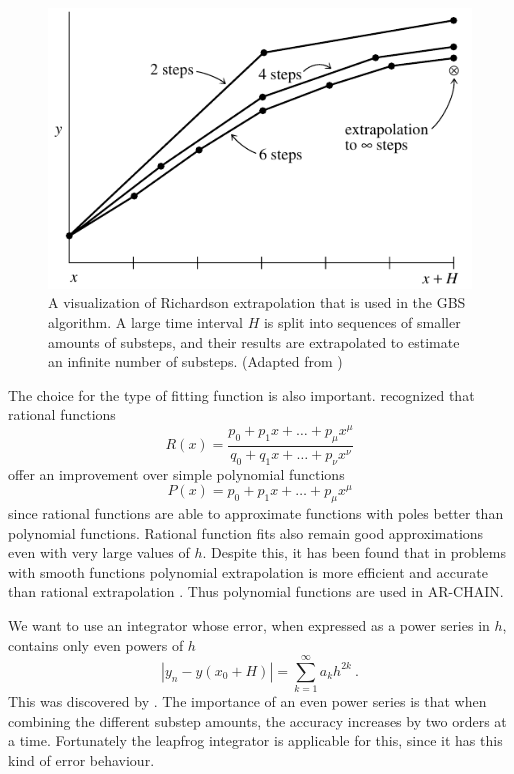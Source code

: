 \documentclass[english, oneside]{HYgradu}
\begin{document}
\begin{figure}[h!tb]
\centering
\includegraphics[scale=1.4]{../images/gbs.pdf}
\caption{A visualization of Richardson extrapolation that is used in the GBS algorithm. A large time interval $H$ is split into sequences of smaller amounts of substeps, and their results are extrapolated to estimate an infinite number of substeps.
(Adapted from \citealt{press:2007})}
\label{fig:gbs}
\end{figure}

The choice for the type of fitting function is also important. \cite{bulirsch:1966} recognized that rational functions
\begin{equation}
R(x) = \frac{p_0 + p_1 x + \ldots + p_{\mu}x^{\mu}}{q_0 + q_1 x + \ldots + p_{\nu}x^{\nu}}
\end{equation}
offer an improvement over simple polynomial functions
\begin{equation}
P(x) = p_0 + p_1 x + \ldots + p_{\mu}x^{\mu}
\end{equation}
since rational functions are able to approximate functions with poles better than polynomial functions. Rational function fits also remain good approximations even with very large values of $h$. Despite this, it has been found that in problems with smooth functions polynomial extrapolation is more efficient and accurate than rational extrapolation \citep{press:2007}. Thus polynomial functions are used in AR-CHAIN.

We want to use an integrator whose error, when expressed as a power series in $h$, contains only even powers of $h$
\begin{equation}
|y_n - y(x_0 + H)| = \sum_{k=1}^{\infty} a_k h^{2k} \ .
\end{equation}
This was discovered by \cite{gragg:1965}. The importance of an even power series is that when combining the different substep amounts, the accuracy increases by two orders at a time. Fortunately the leapfrog integrator is applicable for this, since it has this kind of error behaviour.
\end{document}
